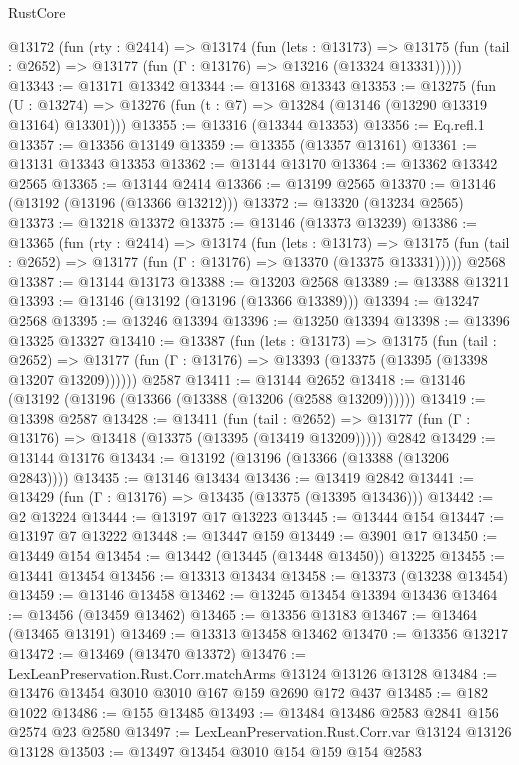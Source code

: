 \begin{lexlean}{RustCore}
\begin{coremodule}
  @13172
    (fun (rty : @2414) =>
    @13174
      (fun (lets : @13173) =>
      @13175 (fun (tail : @2652) => @13177 (fun (Γ : @13176) => @13216 (@13324 @13331)))))
@13343 := @13171 @13342
@13344 := @13168 @13343
@13353 := @13275
    (fun (U : @13274) => @13276 (fun (t : @7) => @13284 (@13146 (@13290 @13319 @13164) @13301)))
@13355 := @13316 (@13344 @13353)
@13356 := Eq.refl.{1}
@13357 := @13356 @13149
@13359 := @13355 (@13357 @13161)
@13361 := @13131 @13343 @13353
@13362 := @13144 @13170
@13364 := @13362 @13342 @2565
@13365 := @13144 @2414
@13366 := @13199 @2565
@13370 := @13146 (@13192 (@13196 (@13366 @13212)))
@13372 := @13320 (@13234 @2565)
@13373 := @13218 @13372
@13375 := @13146 (@13373 @13239)
@13386 := @13365
    (fun (rty : @2414) =>
    @13174
      (fun (lets : @13173) =>
      @13175 (fun (tail : @2652) => @13177 (fun (Γ : @13176) => @13370 (@13375 @13331)))))
    @2568
@13387 := @13144 @13173
@13388 := @13203 @2568
@13389 := @13388 @13211
@13393 := @13146 (@13192 (@13196 (@13366 @13389)))
@13394 := @13247 @2568
@13395 := @13246 @13394
@13396 := @13250 @13394
@13398 := @13396 @13325 @13327
@13410 := @13387
    (fun (lets : @13173) =>
    @13175
      (fun (tail : @2652) =>
      @13177 (fun (Γ : @13176) => @13393 (@13375 (@13395 (@13398 @13207 @13209))))))
    @2587
@13411 := @13144 @2652
@13418 := @13146 (@13192 (@13196 (@13366 (@13388 (@13206 (@2588 @13209))))))
@13419 := @13398 @2587
@13428 := @13411
    (fun (tail : @2652) => @13177 (fun (Γ : @13176) => @13418 (@13375 (@13395 (@13419 @13209)))))
    @2842
@13429 := @13144 @13176
@13434 := @13192 (@13196 (@13366 (@13388 (@13206 @2843))))
@13435 := @13146 @13434
@13436 := @13419 @2842
@13441 := @13429 (fun (Γ : @13176) => @13435 (@13375 (@13395 @13436)))
@13442 := @2 @13224
@13444 := @13197 @17 @13223
@13445 := @13444 @154
@13447 := @13197 @7 @13222
@13448 := @13447 @159
@13449 := @3901 @17
@13450 := @13449 @154
@13454 := @13442 (@13445 (@13448 @13450)) @13225
@13455 := @13441 @13454
@13456 := @13313 @13434
@13458 := @13373 (@13238 @13454)
@13459 := @13146 @13458
@13462 := @13245 @13454 @13394 @13436
@13464 := @13456 (@13459 @13462)
@13465 := @13356 @13183
@13467 := @13464 (@13465 @13191)
@13469 := @13313 @13458 @13462
@13470 := @13356 @13217
@13472 := @13469 (@13470 @13372)
@13476 := LexLeanPreservation.Rust.Corr.matchArms @13124 @13126 @13128
@13484 := @13476 @13454 @3010 @3010 @167 @159 @2690 @172 @437
@13485 := @182 @1022
@13486 := @155 @13485
@13493 := @13484 @13486 @2583 @2841 @156 @2574 @23 @2580
@13497 := LexLeanPreservation.Rust.Corr.var @13124 @13126 @13128
@13503 := @13497 @13454 @3010 @154 @159 @154 @2583

\end{coremodule}
\end{lexlean}
